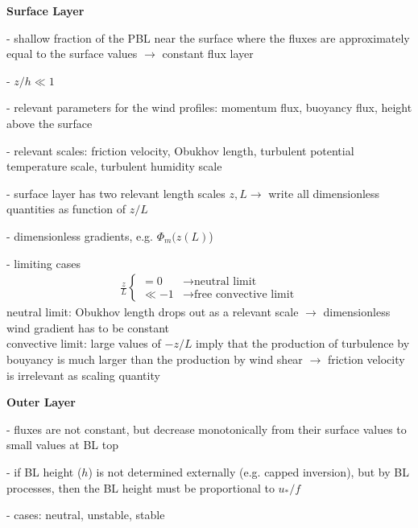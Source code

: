 \documentclass[11pt]{article}
\begin{document}
	\textbf{Surface Layer}
	\begin{compactenum}
		\item[-] shallow fraction of the PBL near the surface where the fluxes are approximately equal to the surface values $\rightarrow$ constant flux layer
		\item[-] $z/h \ll 1$
		\item[-] relevant parameters for the wind profiles: momentum flux, buoyancy flux, height above the surface
		\item[-] relevant scales: friction velocity, Obukhov length, turbulent potential temperature scale, turbulent humidity scale
		\item[-] surface layer has two relevant length scales $z, L \rightarrow$ write all dimensionless quantities as function of $z/L$
		\item[-] dimensionless gradients, e.g. $\Phi_m(z(L)$) 
		\item[-] limiting cases
		\begin{align}
			\frac{z}{L} \begin{cases}
			= 0 &\rightarrow \textrm{neutral limit} \\
			\ll-1 &\rightarrow \textrm{free convective limit}
			\end{cases}
		\end{align} 
		neutral limit: Obukhov length drops out as a relevant scale $\rightarrow$ dimensionless wind gradient has to be constant \\
		convective limit: large values of $-z/L$ imply that the production of turbulence by bouyancy is much larger than the production by wind shear $\rightarrow$ friction velocity is irrelevant as scaling quantity\\
	\end{compactenum}
	
	\textbf{Outer Layer}
	\begin{compactenum}
		\item[-] fluxes are not constant, but decrease monotonically from their surface values to small values at BL top
		\item[-] if BL height ($h$) is not determined externally (e.g. capped inversion), but by BL processes, then the BL height must be proportional to $u_*/f$
		\item[-] cases: neutral, unstable, stable
	\end{compactenum}
\end{document}
